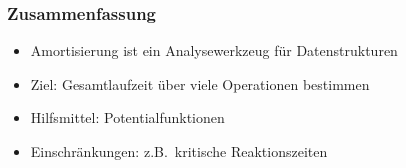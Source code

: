 \documentclass[aspectratio=1610, 11pt]{beamer}
\begin{document}
\begin{frame}\frametitle{Zusammenfassung}
	\begin{exampleblock}{}
		\begin{itemize}
			\item Amortisierung ist ein Analysewerkzeug f\"ur Datenstrukturen 
			\item \alert{Ziel:} Gesamtlaufzeit \"uber viele Operationen bestimmen
			\item \alert{Hilfsmittel:} Potentialfunktionen
			\item \alert{Einschr\"ankungen:} z.B.\ kritische Reaktionszeiten
		\end{itemize}
	\end{exampleblock}
\end{frame}
\end{document}
